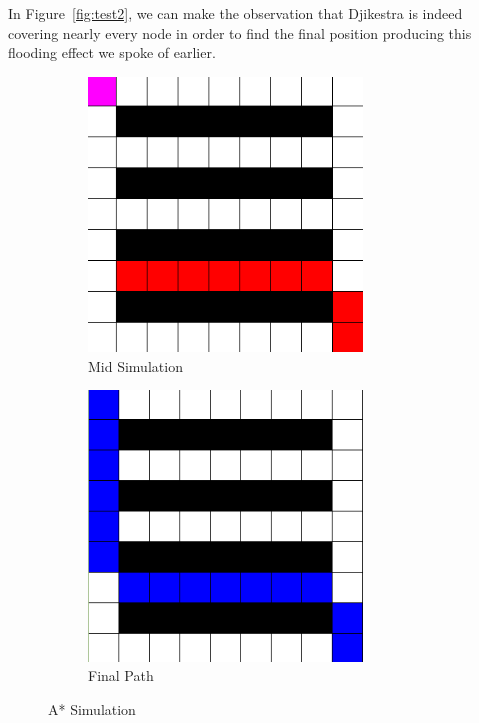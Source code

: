 \documentclass[twocolumn]{article}
\begin{document}
In Figure~\ref{fig:test2}, we can make the observation that Djikestra is indeed covering nearly every node in order to find the final position producing this flooding effect we spoke of earlier.

\begin{figure}[H]
    \centering
    \begin{subfigure}{0.235\textwidth}
        \centering
        \includegraphics[width=0.8\textwidth]{figures/2024-05-22_22-45_1.png}
        \caption{Mid Simulation}
    \end{subfigure}
    \hfill
    \begin{subfigure}{0.235\textwidth}
        \centering
          \includegraphics[width=0.8\textwidth]{figures/2024-05-22_22-45.png}
        \caption{Final Path}
    \end{subfigure}
    \caption{A* Simulation}
    \label{fig:test3}
\end{figure}
\end{document}
